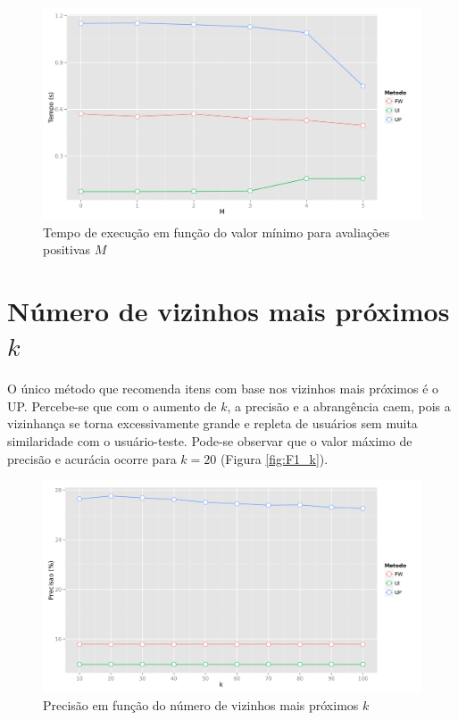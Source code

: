 \begin{figure}[htp]
    \begin{center}
    \includegraphics[width=1\textwidth]{img/time_M}
    \end{center}
    \label{fig:time_M}
    \caption{Tempo de execução em função do valor mínimo para avaliações positivas $M$}
\end{figure}

\section{Número de vizinhos mais próximos $k$} %
\label{sec:n_mero_de_vizinhos_mais_pr_ximos_}

O único método que recomenda itens com base nos vizinhos mais próximos é o UP. Percebe-se que com o aumento de $k$, a precisão e a abrangência caem, pois a vizinhança se torna excessivamente grande e repleta de usuários sem muita similaridade com o usuário-teste. Pode-se observar que o valor máximo de precisão e acurácia ocorre para $k=20$ (Figura \ref{fig:F1_k}).

\begin{figure}[htp]
    \begin{center}
    \includegraphics[width=1\textwidth]{img/precision_k}
    \end{center}
    \label{fig:precision_k}
    \caption{Precisão em função do número de vizinhos mais próximos $k$}
\end{figure}


